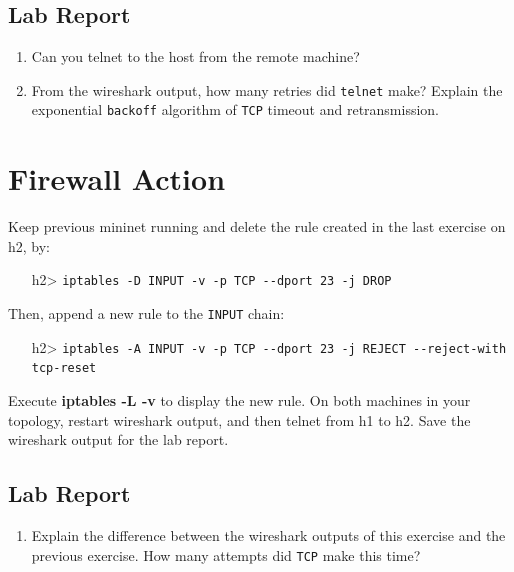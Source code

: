 \documentclass[10pt,a4paper]{article}
\numberwithin{equation}{section}
\numberwithin{figure}{section}
\numberwithin{table}{section}
\begin{document}
	\subsection{Lab Report}
	\begin{enumerate}
		\setlength{\itemindent}{0pt}
		\item Can you telnet to the host from the remote machine?
		\item From the wireshark output, how many retries did \texttt{telnet} make? Explain the exponential \texttt{backoff} algorithm of \texttt{TCP} timeout and retransmission.
	\end{enumerate}
	
	\section{Firewall Action}
	Keep previous mininet running and delete the rule created in the last exercise on h2, by:
	
	\begin{itemize}
		\setlength{\itemindent}{10pt}
		\item [h2>] \texttt{iptables -D INPUT -v -p TCP {-}{-}dport 23 -j DROP}
	\end{itemize}
	
	\setlength{\parindent}{0pt}
	Then, append a new rule to the \texttt{INPUT} chain:
	
	\begin{itemize}
		\setlength{\itemindent}{10pt}
		\item [h2>] \texttt{iptables -A INPUT -v -p TCP {-}{-}dport 23 -j REJECT {-}{-}reject-with tcp-reset} 
	\end{itemize}
	
	\setlength{\parindent}{0pt}
	Execute \textbf{iptables -L -v} to display the new rule. On both machines in your topology, restart wireshark output, and then telnet from h1 to h2. Save the wireshark output for the lab report.
	
	\subsection{Lab Report}
	\begin{enumerate}
		\setlength{\itemindent}{0pt}
		\item Explain the difference between the wireshark outputs of this exercise and the previous exercise. How many attempts did \texttt{TCP} make this time?
	\end{enumerate}
	
\end{document}
